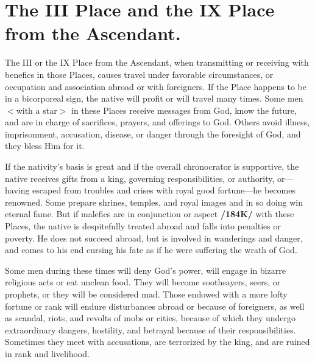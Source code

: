 \section{The III Place and the IX Place from the Ascendant.}

The III or the IX Place from the Ascendant, when transmitting or receiving with benefics in those Places, causes travel under favorable circumstances, or occupation and association abroad or with foreigners. If the Place happens to be in a bicorporeal sign, the native will profit or will travel many times. Some men $<$with a star$>$ in these Places receive messages from God, know the future, and are in charge of sacrifices, prayers, and offerings to God. Others avoid illness, imprisonment, accusation, disease, or danger through the foresight of God, and they bless Him for it. 

If the nativity’s basis is great and if the overall chronocrator is supportive, the native receives gifts from a king, governing responsibilities, or authority, or—having escaped from troubles and crises with royal good fortune—he becomes renowned. Some prepare shrines, temples, and royal images and in so doing win eternal fame. But if malefics are in conjunction or aspect \textbf{/184K/} with these Places, the native is despitefully treated abroad and falls into penalties or poverty. He does not succeed abroad, but is involved in wanderings and danger, and comes to his end cursing his fate as if he were suffering the wrath of God. 

\enlargethispage{2\baselineskip}
Some men during these times will deny God’s power, will engage in bizarre religious acts or eat unclean food. They will become soothsayers, seers, or prophets, or they will be considered mad. Those endowed with a more lofty fortune or rank will endure disturbances abroad or because of foreigners, as well as scandal, riots, and revolts of mobs or cities, because of which they undergo extraordinary dangers, hostility, and betrayal because of their responsibilities. Sometimes they meet with accusations, are terrorized by the king, and are ruined in rank and livelihood.

\newpage